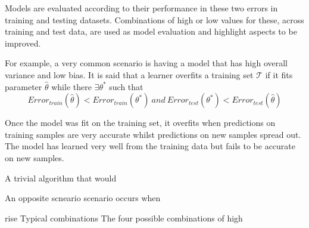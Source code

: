  
 Models are evaluated according to their performance in these two errors in training and testing datasets. Combinations of high or low values for these, across training and test data, are used as model evaluation and highlight aspects to be improved. 
 
 For example, a very common scenario is having a model that has high overall variance and low bias. 
 It is said that a learner overfits a training set $\mathcal{T}$ if it fits parameter $\hat{\theta}$ while there $\exists \theta^*$ such that
 \begin{equation} \label{eq:overfitting}
 Error_{train}(\hat{\theta}) < Error_{train}(\theta^*) \  and \ Error_{test}(\theta^*) < Error_{test}(\hat{\theta})   
 \end{equation}
 
 Once the model was fit on the training set, it overfits when predictions on training samples are very accurate whilst predictions on new samples spread out. The model has learned very well from the training data but fails to be accurate on new samples.
 
 A trivial algorithm that would 
 
 An opposite scneario scenario occurs when
 
 
 rise Typical combinations
 The four possible combinations of high 
 

